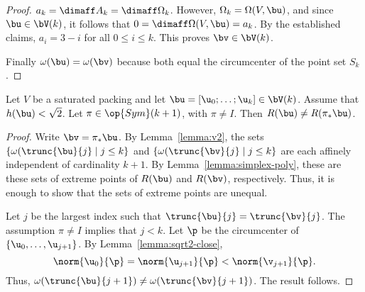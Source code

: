 \begin{proof}
$a_k = \dimaff A_k=\dimaff \Omega_k$.  However, $\Omega_k=
\Omega(V,\bu)$, and since $\bu\in \bV(k)$, it follows that $0=\dimaff\Omega(V,\bu)=a_k$.
By the established claims, $a_i = 3-i$ for all $0\le i\le k$.  This proves $\bv\in\bV(k)$.

Finally $\omega(\bu) = \omega(\bv)$ because both equal the circumcenter of the
point set $S_k$.
%
\end{proof}

\begin{lemma}
  Let $V$ be a saturated packing and let $\bu = [\u_0;\ldots;\u_k]\in
  \bV(k)$.  Assume that $h(\bu)<\sqrt2$.  Let $\pi\in\op{Sym}(k+1)$, with $\pi\ne I$.
  Then $R(\bu)\ne R(\pi_*\bu)$.
\end{lemma}

\begin{proof}
Write $\bv = \pi_*\bu$.  By Lemma~\ref{lemma:v2}, the sets
$\{\omega(\trunc{\bu}{j}\mid j\le k\}$ and 
$\{\omega(\trunc{\bv}{j}\mid j\le k\}$ are each affinely independent of
cardinality $k+1$.  By Lemma~\ref{lemma:simplex-poly}, these are these sets
of extreme points of $R(\bu)$ and $R(\bv)$, respectively.  Thus, it is enough
to show that the sets of extreme points are unequal.

Let $j$ be the largest index such that $\trunc{\bu}{j}=\trunc{\bv}{j}$.
The assumption $\pi\ne I$ implies that $j<k$.  Let $\p$ be the circumcenter
of $\{\u_0,\ldots,\u_{j+1}\}$.  By Lemma~\ref{lemma:sqrt2-close}, 
\begin{displaymath}
\norm{\u_0}{\p} = \norm{\u_{j+1}}{\p} < \norm{\v_{j+1}}{\p}.
\end{displaymath}
Thus, $\omega(\trunc{\bu}{j+1}) \ne \omega(\trunc{\bv}{j+1})$.  The result follows.
\end{proof}

